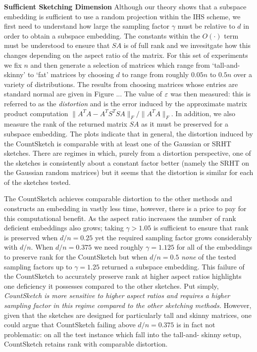 \noindent\textbf{Sufficient Sketching Dimension}
Although our theory shows that a subspace embedding is sufficient to use a random
projection within the IHS scheme, we first need to understand how large the
sampling factor $\gamma$ must be relative to $d$ in order to obtain a subspace
embedding.
The constants within the $O(\cdot)$ term must be understood to ensure that $SA$
is of full rank and we invesitgate how this changes depending on the aspect
ratio of the matrix.
For this set of experiments we fix $n$ and then generate a selection of matrices
which range from `tall-and-skinny' to `fat' matrices by choosing $d$ to range
from roughly $0.05n$ to $0.5n$ over a variety of distributions.
The results from choosing matrices whose entries are standard normal are given
in Figure ...
The value of $\varepsilon$ was then measured: this is referred to as the \textit{
distortion} and is the error induced by the approximate matrix product
computation $\|A^T A - A^T S^T S A \|_F/\|A^TA\|_F$.
In addition, we also measure the rank of the returned matrix $SA$ as it must
be preserved for a subspace embedding.
The plots indicate that in general, the distortion induced by the CountSketch is
comparable with at least one of the Gaussian or SRHT sketches.
There are regimes in which, purely from a distortion perspective, one of the
sketches is consistently about a constant factor better (namely the SRHT on the
Gaussian random matrices) but it seems that the distortion is similar for each
of the sketches tested.

The CountSketch achieves comparable distortion to the other methods and constructs
an embedding in vastly less time, however, there is a price to pay for this
computational benefit.
As the aspect ratio increases the number of rank deficient embeddings also
grows; taking $\gamma > 1.05$ is sufficient to ensure that rank is preserved
when $d/n=0.25$ yet the required sampling factor grows considerably with $d/n$.
When $d/n=0.375$ we need roughly $\gamma = 1.125$ for all of the embeddings to
preserve rank for the CountSketch but when $d/n = 0.5$ \textit{none} of the
tested sampling factors up to $\gamma=1.25$ returned a subspace embedding.
This failure of the CountSketch to accurately preserve rank at higher aspect
ratios highlights one deficiency it possesses compared to the other sketches.
Put simply, \textit{CountSketch is more sensitive to higher aspect ratios and
requires a higher sampling factor in this regime compared to the other
sketching methods.}
However, given that the sketches are designed for particularly tall and skinny
matrices, one could argue that CountSketch failing above $d/n = 0.375$ is in
fact not problematic: on all the test instance which fall into the tall-and-
skinny setup, CountSketch retains rank with comparable distortion.

